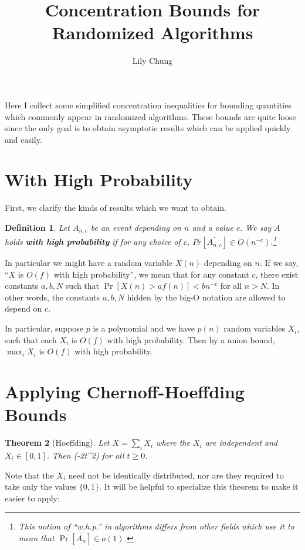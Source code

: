 \documentclass[11pt,a4paper]{article}
\title{Concentration Bounds for Randomized Algorithms}
\author{Lily Chung}
\date{}
\newtheorem{theorem}{Theorem}
\newtheorem{definition}[theorem]{Definition}
\newcommand*{\defn}[1]{\textbf{#1}}
\newcommand*{\E}[0]{\mathbf{E}}
\def\[#1\]{\begin{align*}#1\end{align*}}
\begin{document}
\maketitle

Here I collect some simplified concentration inequalities for bounding quantities which commonly appear in randomized algorithms.
These bounds are quite loose since the only goal is to obtain asymptotic results which can be applied quickly and easily.

\section{With High Probability}

First, we clarify the kinds of results which we want to obtain.

\begin{definition}
  Let \(A_{n, c}\) be an event depending on \(n\) and a value \(c\).
  We say \(A\) holds \defn{with high probability} if
  for any choice of \(c\),
  \(Pr[\overline{A_{n, c}}] \in O(n^{-c})\).\footnote{This notion of ``w.h.p.'' in algorithms differs from other fields which use it to mean that $\Pr[\overline{A_n}] \in o(1)$.}
\end{definition}

In particular we might have a random variable \(X(n)\) depending on \(n\).
If we say, ``\(X\) is \(O(f)\) with high probability'',
we mean that for any constant \(c\), there exist constants \(a, b, N\) such that
\(\Pr[X(n) > af(n)] < bn^{-c}\) for all \(n > N\).
In other words, the constants \(a, b, N\) hidden by the big-O notation are allowed to depend on \(c\).

In particular, suppose \(p\) is a polynomial and we have \(p(n)\) random variables \(X_i\),
such that each \(X_i\) is \(O(f)\) with high probability.
Then by a union bound, \(\max_i X_i\) is \(O(f)\) with high probability.

\section{Applying Chernoff-Hoeffding Bounds}

\begin{theorem}[Hoeffding]
  \label{thm:hoeffding}
  Let $X = \sum_i X_i$ where the $X_i$ are independent and $X_i \in [0, 1]$.
  Then \[\Pr[X - \E X \ge t] \le \exp(-2t^2)\]
  for all $t \ge 0$.
\end{theorem}

Note that the \(X_i\) need not be identically distributed, nor are they required to take only the values \(\{0, 1\}\).
It will be helpful to specialize this theorem to make it easier to apply:
\end{document}
